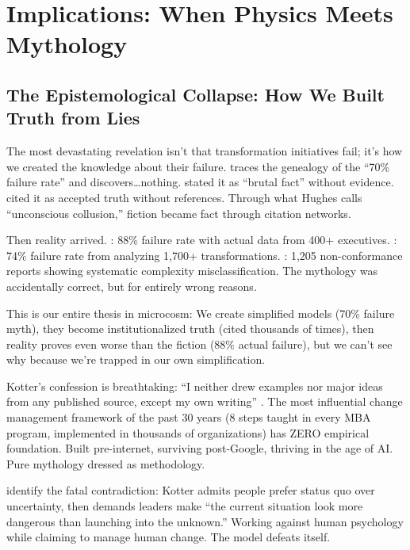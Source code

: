 \section{Implications: When Physics Meets Mythology}
\label{sec:implications}

\subsection{The Epistemological Collapse: How We Built Truth from Lies}

The most devastating revelation isn't that transformation initiatives fail; it's how we created the knowledge about their failure. \citet{hughes2011} traces the genealogy of the ``70\% failure rate'' and discovers\ldots nothing. \citet{beer2000} stated it as ``brutal fact'' without evidence. \citet{kotter2008} cited it as accepted truth without references. Through what Hughes calls ``unconscious collusion,'' fiction became fact through citation networks.

Then reality arrived. \citet{bain2024}: 88\% failure rate with actual data from 400+ executives. \citet{bcg2024}: 74\% failure rate from analyzing 1,700+ transformations. \citet{ford2024}: 1,205 non-conformance reports showing systematic complexity misclassification. The mythology was accidentally correct, but for entirely wrong reasons.

This is our entire thesis in microcosm: We create simplified models (70\% failure myth), they become institutionalized truth (cited thousands of times), then reality proves even worse than the fiction (88\% actual failure), but we can't see why because we're trapped in our own simplification.

Kotter's confession is breathtaking: ``I neither drew examples nor major ideas from any published source, except my own writing'' \citep{hughes2015}. The most influential change management framework of the past 30 years (8 steps taught in every MBA program, implemented in thousands of organizations) has ZERO empirical foundation. Built pre-internet, surviving post-Google, thriving in the age of AI. Pure mythology dressed as methodology.

\citet{mclaren2023} identify the fatal contradiction: Kotter admits people prefer status quo over uncertainty, then demands leaders make ``the current situation look more dangerous than launching into the unknown.'' Working against human psychology while claiming to manage human change. The model defeats itself.

